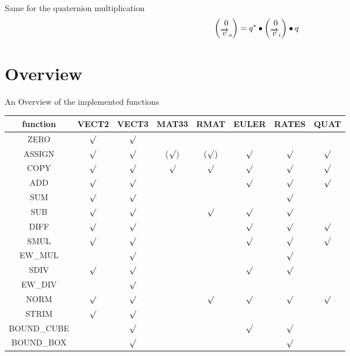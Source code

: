Same for the quaternion multiplication
\begin{equation}
\begin{pmatrix}0\\\overrightarrow{v}_o\end{pmatrix} = q_{}^* \bullet \begin{pmatrix}0\\\overrightarrow{v}_i\end{pmatrix} \bullet q_{}
\end{equation}

\section{Overview}
An Overview of the implemented functions\\
\newcommand{\YES}{$\surd$}
\newcommand{\NO}{}
\begin{tabular}{c|ccccccc}
function	& VECT2	& VECT3	& MAT33	& RMAT	& EULER	& RATES	& QUAT	\\  \hline
ZERO		& \YES	& \YES	& \NO	& \NO	& \NO	& \NO	& \NO	\\
ASSIGN		& \YES	& \YES	&(\YES) &(\YES) & \YES	& \YES	& \YES	\\
COPY		& \YES	& \YES	& \YES	& \YES	& \YES	& \YES	& \YES	\\
ADD			& \YES	& \YES	& \NO	& \NO	& \YES	& \YES	& \YES	\\
SUM			& \YES	& \YES	& \NO	& \NO	& \NO	& \YES	& \NO	\\
SUB			& \YES	& \YES	& \NO	& \YES	& \YES	& \YES	& \NO	\\
DIFF		& \YES	& \YES	& \NO	& \NO	& \YES	& \YES	& \YES	\\
SMUL		& \YES	& \YES	& \NO	& \NO	& \YES	& \YES	& \YES	\\
EW\_MUL		& \NO	& \YES	& \NO	& \NO	& \NO	& \YES	& \NO	\\
SDIV		& \YES	& \YES	& \NO	& \NO	& \YES	& \YES	& \NO	\\
EW\_DIV		& \NO	& \YES	& \NO	& \NO	& \NO	& \NO	& \NO	\\
NORM		& \YES	& \YES	& \NO	& \YES	& \YES	& \YES	& \YES	\\
STRIM		& \YES	& \YES	& \NO	& \NO	& \NO	& \NO	& \NO	\\
BOUND\_CUBE	& \NO	& \YES	& \NO	& \NO	& \YES	& \YES	& \NO	\\
BOUND\_BOX	& \NO	& \YES	& \NO	& \NO	& \NO	& \YES	& \NO
\end{tabular}
